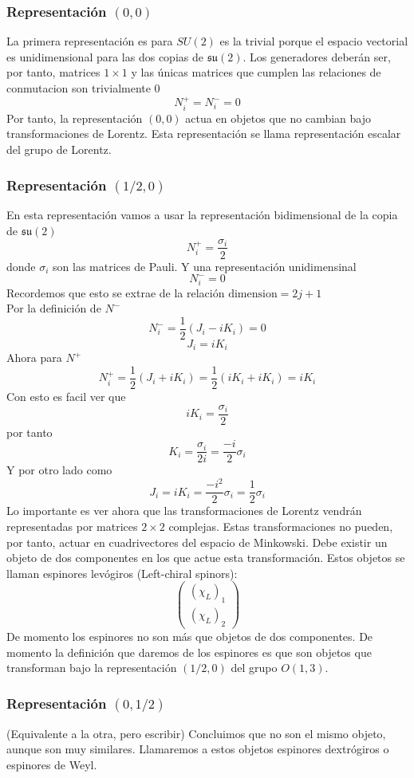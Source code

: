\documentclass[12pt]{article}
\begin{document}
\subsubsection{Representación $(0,0)$}
La primera representación es para $SU(2)$ es la trivial porque el espacio vectorial es unidimensional para las dos copias de $\mathfrak{su(2)}$. Los generadores deberán ser, por tanto, matrices $1\times1$ y las únicas matrices que cumplen las relaciones de conmutacion son trivialmente 0
$$N_i^+=N_i^-=0$$
Por tanto, la representación $(0,0)$ actua en objetos que no cambian bajo transformaciones de Lorentz. Esta representación se llama representación escalar del grupo de Lorentz.
\subsubsection{Representación $(1/2,0)$}
En esta representación vamos a usar la representación bidimensional de la copia de $\mathfrak{su(2)}$ $$N_i^+=\frac{\sigma_i}{2}$$ donde $\sigma_i$ son las matrices de Pauli. Y una representación unidimensinal $$N_i^-=0$$ 
Recordemos que esto se extrae de la relación $\text{dimension}=2j+1$\\
Por la definición de $N^-$ 
$$N_i^-=\frac{1}{2}(J_i-iK_i)=0$$
$$J_i=iK_i$$
Ahora para $N^+$
$$N_i^+=\frac{1}{2}(J_i+iK_i)=\frac{1}{2}(iK_i+iK_i)=iK_i$$
Con esto es facil ver que
$$iK_i=\frac{\sigma_i}{2}$$
por tanto
$$K_i=\frac{\sigma_i}{2i}=\frac{-i}{2}\sigma_i$$
Y por otro lado como 
$$J_i=iK_i=\frac{-i^2}{2}\sigma_i=\frac{1}{2}\sigma_i $$
Lo importante es ver ahora que las transformaciones de Lorentz vendrán representadas por matrices $2\times2$ complejas. Estas transformaciones no pueden, por tanto, actuar en cuadrivectores del espacio de Minkowski. Debe existir un objeto de dos componentes en los que actue esta transformación. Estos objetos se llaman espinores levógiros (Left-chiral spinors):
$$\begin{pmatrix}
	(\chi_L)_1 \\ (\chi_L)_2
\end{pmatrix}$$
De momento los espinores no son más que objetos de dos componentes. De momento la definición que daremos de los espinores es que son objetos que transforman bajo la representación $(1/2,0)$ del grupo $O(1,3)$. 
\subsubsection{Representación $(0,1/2)$}
(Equivalente a la otra, pero escribir)
Concluimos que no son el mismo objeto, aunque son muy similares. Llamaremos a estos objetos espinores dextrógiros o espinores de Weyl.\\
\end{document}
